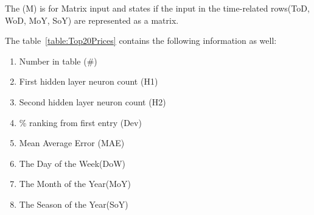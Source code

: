 The (M) is for Matrix input and states if the input in the time-related rows(ToD, WoD, MoY, SoY) are represented as a matrix.

The table~\ref{table:Top20Prices} contains the following information as well:
\begin{enumerate}
	\item Number in table (\#)
	\item First hidden layer neuron count (H1)
	\item Second hidden layer neuron count (H2)
	\item \% ranking from first entry (Dev)
	\item Mean Average Error (MAE)
	\item The Day of the Week(DoW)
	\item The Month of the Year(MoY)
	\item The Season of the Year(SoY)
\end{enumerate}

